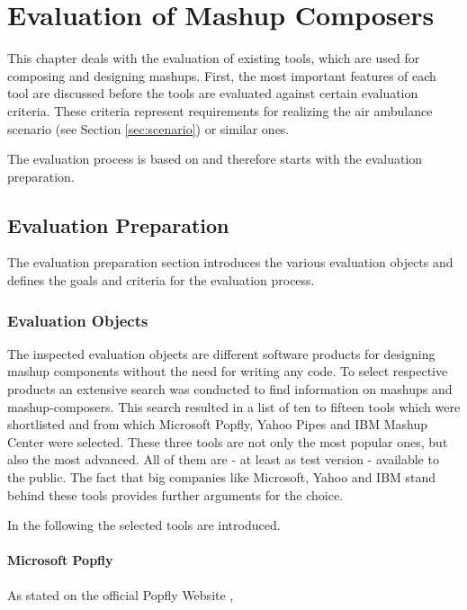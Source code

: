 \chapter{Evaluation of Mashup Composers}
\label{chapter:evaluation}

This chapter deals with the evaluation of existing tools, which are used for composing and
designing mashups. First, the most important features of each tool are discussed before the tools
are evaluated against certain evaluation criteria. These criteria represent requirements for realizing the air
ambulance scenario (see Section \ref{sec:scenario}) or similar ones.

The evaluation process is based on \cite{Heinrich2000} and therefore starts with the evaluation
preparation.

\section{Evaluation Preparation}

The evaluation preparation section introduces the various evaluation objects
and defines the goals and criteria for the evaluation process.

\subsection{Evaluation Objects}
\label{sec:evaluation_objects}

The inspected evaluation objects are different software products for designing mashup components
without the need for writing any code. To select respective products an extensive search was
conducted to find information on mashups and mashup-composers. This search resulted in a list of
ten to fifteen tools which were shortlisted and from which Microsoft Popfly, Yahoo Pipes and IBM Mashup
Center were selected. These three tools are not only the most popular ones, but also the most
advanced. All of them are - at least as test version - available to the public. The fact that
big companies like Microsoft, Yahoo and IBM stand behind these tools provides further arguments for
the choice.

In the following the selected tools are introduced.

\subsubsection{Microsoft Popfly}
\label{sec:microsoft_popfly}

As stated on the official Popfly Website \cite{microsoft_popfly},

